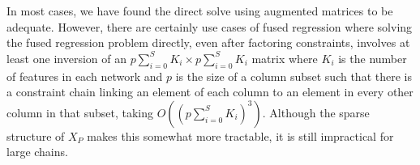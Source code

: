 \documentclass[11pt]{article}
\begin{document}
In most cases, we have found the direct solve using augmented matrices to be adequate. However, there are certainly use cases of fused regression where solving the fused regression problem directly, even after factoring constraints, involves at least one inversion of an $p\sum_{i=0}^S K_i \times p \sum_{i=0}^S K_i$ matrix where $K_i$ is the number of features in each network and $p$ is the size of a column subset such that there is a constraint chain linking an element of each column to an element in every other column in that subset, taking $O((p\sum_{i=0}^S K_i)^3)$.
Although the sparse structure of $X_P$ makes this somewhat more tractable, it is still impractical for large chains.



\end{document}
